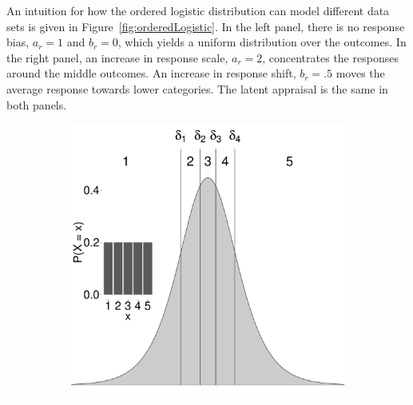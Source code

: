 \documentclass{article}
\newcommand{\Irater}{r}
\begin{document}
An intuition for how the ordered logistic distribution can model different data sets is given in Figure~\ref{fig:orderedLogistic}. In the left panel, there is no response bias, $a_\Irater = 1$ and $b_\Irater = 0$, which yields a uniform distribution over the outcomes. In the right panel, an increase in response scale, $a_\Irater = 2$, concentrates the responses around the middle outcomes. An increase in response shift, $b_\Irater = .5$ moves the average response towards lower categories. The latent appraisal is the same in both panels.
\begin{figure}[!ht]
	\centering
	\begin{subfigure}{.5\textwidth}
		\centering
		\includegraphics[width=.98\textwidth]{figures/orderedLogisticUnbiased.pdf}
	\end{subfigure}%
	\begin{subfigure}{.5\textwidth}
		\centering

\end{subfigure}
\end{figure}
\end{document}
